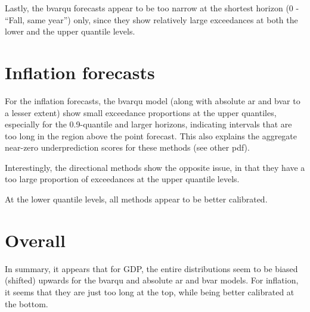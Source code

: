 \documentclass[
]{article}
\begin{document}
Lastly, the bvarqu forecasts appear to be too narrow at the shortest horizon (0 - ``Fall, same year'') only, since they show relatively large exceedances at both the lower and the upper quantile levels.

\hypertarget{inflation-forecasts}{%
\section{Inflation forecasts}\label{inflation-forecasts}}

For the inflation forecasts, the bvarqu model (along with absolute ar and bvar to a lesser extent) show small exceedance proportions at the upper quantiles, especially for the 0.9-quantile and larger horizons, indicating intervals that are too long in the region above the point forecast. This also explains the aggregate near-zero underprediction scores for these methods (see other pdf).

Interestingly, the directional methods show the opposite issue, in that they have a too large proportion of exceedances at the upper quantile levels.

At the lower quantile levels, all methods appear to be better calibrated.

\hypertarget{overall}{%
\section{Overall}\label{overall}}

In summary, it appears that for GDP, the entire distributions seem to be biased (shifted) upwards for the bvarqu and absolute ar and bvar models. For inflation, it seems that they are just too long at the top, while being better calibrated at the bottom.
\end{document}
